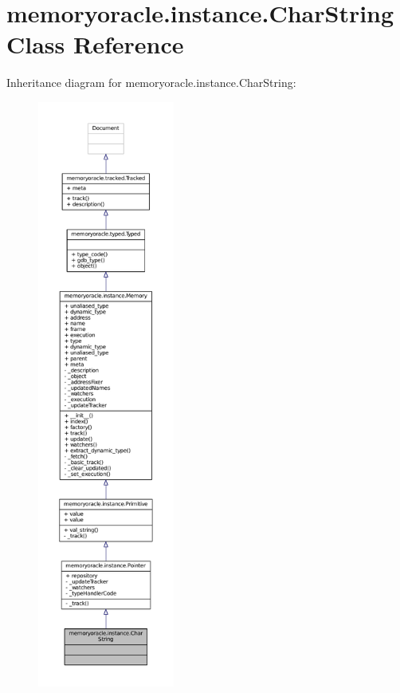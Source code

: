 \hypertarget{classmemoryoracle_1_1instance_1_1CharString}{}\section{memoryoracle.\+instance.\+Char\+String Class Reference}
\label{classmemoryoracle_1_1instance_1_1CharString}


Inheritance diagram for memoryoracle.\+instance.\+Char\+String\+:
\nopagebreak
\begin{figure}[H]
\begin{center}
\leavevmode
\includegraphics[height=550pt]{classmemoryoracle_1_1instance_1_1CharString__inherit__graph}
\end{center}
\end{figure}


